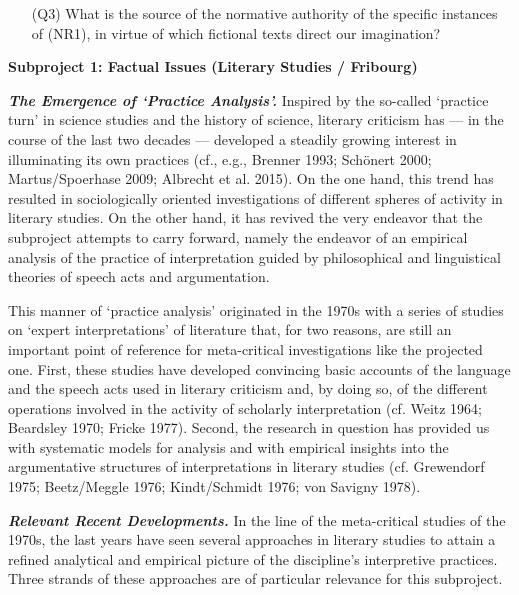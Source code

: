 \vspace{-.1cm}
\begin{itemize}[leftmargin=2cm]
\item[(Q3)] What is the source of the normative authority of the specific instances of (NR1), in virtue of which fictional texts direct our imagination?
\end{itemize}
\vspace{-.1cm}


\vspace{.2cm}
\noindent\textbf{Subproject 1: Factual Issues (Literary Studies / Fribourg)}
\vspace{.2cm}

\noindent \textbf{\emph{The Emergence of `Practice Analysis'.}} Inspired by the so-called `practice turn' in science studies and the history of science, literary criticism has --- in the course of the last two decades --- developed a steadily growing interest in illuminating its own practices (cf., e.g., Brenner 1993; Sch\"onert 2000; Martus/Spoerhase 2009; Albrecht et al. 2015). On the one hand, this trend has resulted in sociologically oriented investigations of different spheres of activity in literary studies. On the other hand, it has revived the very endeavor that the subproject attempts to carry forward, namely the endeavor of an empirical analysis of the practice of interpretation guided by philosophical and linguistical theories of speech acts and argumentation. 

This manner of `practice analysis' originated in the 1970s with a series of studies on `expert interpretations' of literature that, for two reasons, are still an important point of reference for meta-critical investigations like the projected one. First, these studies have developed convincing basic accounts of the language and the speech acts used in literary criticism and, by doing so, of the different operations involved in the activity of scholarly interpretation (cf. Weitz 1964; Beardsley 1970; Fricke 1977). Second, the research in question has provided us with systematic models for analysis and with empirical insights into the argumentative structures of interpretations in literary studies (cf. Grewendorf 1975; Beetz/Meggle 1976; Kindt/Schmidt 1976; von Savigny 1978). 

\vspace{.2cm}
\noindent \textbf{\emph{Relevant Recent Developments.}} In the line of the meta-critical studies of the 1970s, the last years have seen several approaches in literary studies to attain a refined analytical and empirical picture of the discipline's interpretive practices. Three strands of these approaches are of particular relevance for this subproject. 

